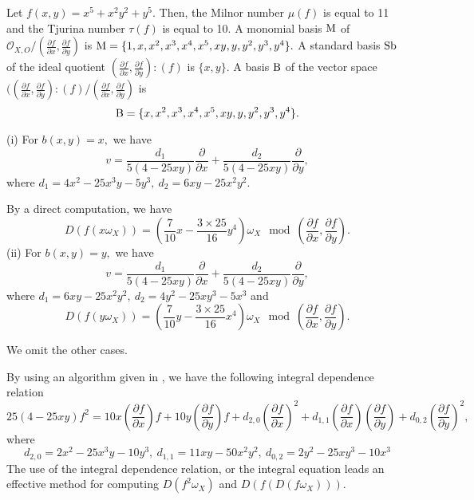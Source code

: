 \documentclass[pdftex]{arxsigma}
\begin{document}
\begin{example}
 Let $ f(x,y)=x^5+x^2y^2+y^5. $ Then, the Milnor number $ \mu(f) $ is equal to 11 and the Tjurina number $ \tau(f) $ is equal to 10. A monomial basis $ {\rm M} $ of $ {\mathcal O}_{X,O}/(\frac{\partial f}{\partial x}, \frac{\partial f}{\partial y}) $ is 
$ {\rm M} = \{1, x, x^2, x^3, x^4, x^5, xy, y, y^2, y^3, y^4 \}. $ A standard basis $ {\rm Sb} $ of the ideal quotient 
$ (\frac{\partial f}{\partial x}, \frac{\partial f}{\partial y}) : (f) $ is $ \{ x, y \} . $ A basis $ {\rm B} $ of the vector space 
$ ( (\frac{\partial f}{\partial x}, \frac{\partial f}{\partial y}) : (f) / (\frac{\partial f}{\partial x}, \frac{\partial f}{\partial y}) $ is 
\begin{equation*}
{\rm B} = \{ x, x^2, x^3, x^4, x^5, xy, y, y^2, y^3, y^4 \}. 
\end{equation*}

\noindent
(i) For $ b(x,y)=x, $ we have 
\begin{equation*}
v=\frac{d_1}{5(4-25xy)}\frac{\partial}{\partial x} + \frac{d_2}{5(4-25xy)}\frac{\partial}{\partial y}, 
\end{equation*}
where
$ d_1=4x^2-25x^3y-5y^3, \ d_2=6xy-25x^2y^2. $

By a direct computation, we have 
\begin{equation*}
D(f(x\omega_X)) = \left(\dfrac{7}{10}x-\dfrac{3\times25}{16}y^4\right)\omega_X  \mod \left(\frac{\partial f}{\partial x}, \frac{\partial f}{\partial y}\right) .
\end{equation*}
\noindent
(ii) For $ b(x,y)=y, $ we have 
\begin{equation*}
 v=\frac{d_1}{5(4-25xy)}\frac{\partial}{\partial x} + \frac{d_2}{5(4-25xy)}\frac{\partial}{\partial y}, 
\end{equation*}
where
$ d_1=6xy-25x^2y^2, \ d_2=4y^2-25xy^3-5x^3 $ and 
\begin{equation*}
D(f(y\omega_X)) = \left(\dfrac{7}{10}y-\dfrac{3\times25}{16}x^4\right)\omega_X \mod \left(\frac{\partial f}{\partial x}, \frac{\partial f}{\partial y}\right) .
\end{equation*}

We omit the other cases.
\end{example}

\begin{remark*}
By using an algorithm given in \cite{NT20}, we have the following integral dependence relation
\begin{equation*}
25(4-25xy)f^2 = 10x\left(\frac{\partial f}{\partial x}\right)f+10y\left(\frac{\partial f}{\partial y}\right)f+d_{2,0}\left(\frac{\partial f}{\partial x}\right)^2+d_{1,1}\left(\frac{\partial f}{\partial x}\right)\left(\frac{\partial f}{\partial y}\right)+d_{0,2}\left(\frac{\partial f}{\partial y}\right)^2, 
\end{equation*}
where 
\begin{equation*}
d_{2,0}=2x^2-25x^3y-10y^3, \ d_{1,1}=11xy-50x^2y^2, \ d_{0,2}=2y^2-25xy^3-10x^3
\end{equation*}
The use of the integral dependence relation, or the integral equation leads an effective method for computing 
$ D(f^2\omega_X) $ and $ D(f(D(f\omega_X))). $
\end{remark*}
\end{document}
